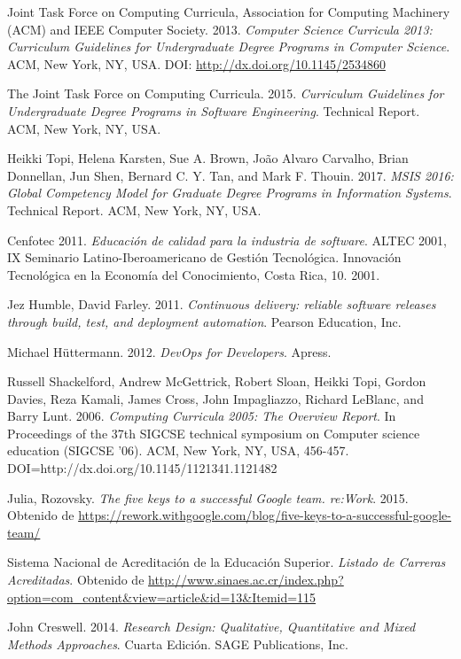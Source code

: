 \begin{thebibliography}{99}
Joint Task Force on Computing Curricula, Association for Computing Machinery (ACM) and IEEE Computer Society. 2013. \emph{Computer Science Curricula 2013: Curriculum Guidelines for Undergraduate Degree Programs in Computer Science}. ACM, New York, NY, USA. DOI: \url{http://dx.doi.org/10.1145/2534860}

The Joint Task Force on Computing Curricula. 2015. \emph{Curriculum Guidelines for Undergraduate Degree Programs in Software Engineering}. Technical Report. ACM, New York, NY, USA. 

Heikki Topi, Helena Karsten, Sue A. Brown, João Alvaro Carvalho, Brian Donnellan, Jun Shen, Bernard C. Y. Tan, and Mark F. Thouin. 2017. \emph{MSIS 2016: Global Competency Model for Graduate Degree Programs in Information Systems}. Technical Report. ACM, New York, NY, USA.

Cenfotec 2011. \emph{Educación de calidad para la industria de software}. ALTEC 2001, IX Seminario Latino-Iberoamericano de Gestión Tecnológica. Innovación Tecnológica en la Economía del Conocimiento, Costa Rica, 10. 2001.

Jez Humble, David Farley. 2011. \emph{Continuous delivery: reliable software releases through build, test, and deployment automation}. Pearson Education, Inc.

Michael Hüttermann. 2012. \emph{DevOps for Developers}. Apress.

Russell Shackelford, Andrew McGettrick, Robert Sloan, Heikki Topi, Gordon Davies, Reza Kamali, James Cross, John Impagliazzo, Richard LeBlanc, and Barry Lunt. 2006. \emph{Computing Curricula 2005: The Overview Report}. In Proceedings of the 37th SIGCSE technical symposium on Computer science education (SIGCSE '06). ACM, New York, NY, USA, 456-457. DOI=http://dx.doi.org/10.1145/1121341.1121482  

Julia, Rozovsky. \emph{The five keys to a successful Google team. re:Work}. 2015. Obtenido de  \url{https://rework.withgoogle.com/blog/five-keys-to-a-successful-google-team/}

Sistema Nacional de Acreditación de la Educación Superior. \emph{Listado de Carreras Acreditadas}. Obtenido de \url{http://www.sinaes.ac.cr/index.php?option=com_content\&view=article&id=13\&Itemid=115}

John Creswell. 2014. \emph{Research Design: Qualitative, Quantitative and Mixed Methods Approaches}. Cuarta Edición. SAGE Publications, Inc.

\end{thebibliography}

